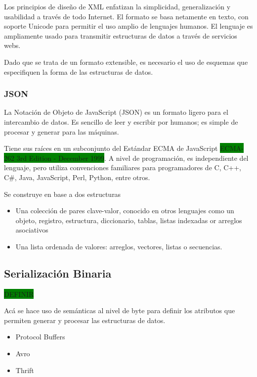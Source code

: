 Los principios de diseño de XML enfatizan la simplicidad, generalización y usabilidad a través de todo Internet. El formato se basa netamente en texto, con soporte Unicode para permitir el uso amplio de lenguajes humanos. El lenguaje es ampliamente usado para transmitir estructuras de datos a través de servicios webs.

Dado que se trata de un formato extensible, es necesario el uso de esquemas que especifiquen la forma de las estructuras de datos.

\subsubsection{JSON}

La Notación de Objeto de JavaScript (JSON) es un formato ligero para el intercambio de datos. Es sencillo de leer y escribir por humanos; es simple de procesar y generar para las máquinas.

Tiene sus raíces en un subconjunto del Estándar ECMA de JavaScript \colorbox{green}{ECMA-262 3rd Edition - December 1999}. A nivel de programación, es independiente del lenguaje, pero utiliza convenciones familiares para programadores de C, C++, C#, Java, JavaScript, Perl, Python, entre otros.

Se construye en base a dos estructuras

\begin{itemize}
  \item Una colección de pares clave-valor, conocido en otros lenguajes como un objeto, registro, estructura, diccionario, tablas, listas indexadas or arreglos asociativos
  \item Una lista ordenada de valores: arreglos, vectores, listas o secuencias.
\end{itemize}

\subsection{Serialización Binaria}
\colorbox{green}{DEFINIR}

Acá se hace uso de semánticas al nivel de byte para definir los atributos que permiten generar y procesar las estructuras de datos.

\begin{itemize}
  \item Protocol Buffers
  \item Avro
  \item Thrift
\end{itemize}

